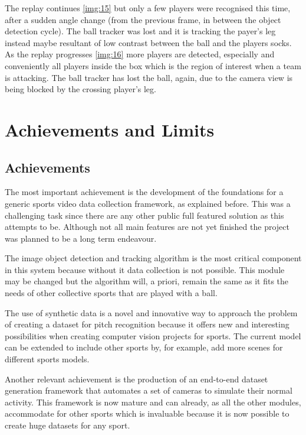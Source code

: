 \documentclass[
    11pt,
    oneside
]{report}
\begin{document}
The replay continues \ref{img:15} but only a few players were recognised this time, after a sudden angle change (from the previous frame, in between the object detection cycle). The ball tracker was lost and it is tracking the payer's leg instead maybe resultant of low contrast between the ball and the players socks. As the replay progresses \ref{img:16} more players are detected, especially and conveniently all players inside the box which is the region of interest when a team is attacking. The ball tracker has lost the ball, again, due to the camera view is being blocked by the crossing player's leg.





\section{Achievements and Limits}

\subsection{Achievements}


The most important achievement is the development of the foundations for a generic sports video data collection framework, as explained before. This was a challenging task since there are any other public full featured solution as this attempts to be. Although not all main features are not yet finished the project was planned to be a long term endeavour.


The image object detection and tracking algorithm is the most critical component in this system because without it data collection is not possible. This module may be changed but the algorithm will, a priori, remain the same as it fits the needs of other collective sports that are played with a ball.


The use of synthetic data is a novel and innovative way to approach the problem of creating a dataset for pitch recognition because it offers new and interesting possibilities when creating computer vision projects for sports. The current model can be extended to include other sports by, for example, add more scenes for different sports models.


Another relevant achievement is the production of an end-to-end dataset generation framework that automates a set of cameras to simulate their normal activity. This framework is now mature and can already, as all the other modules, accommodate for other sports which is invaluable because it is now possible to create huge datasets for any sport.
\end{document}
